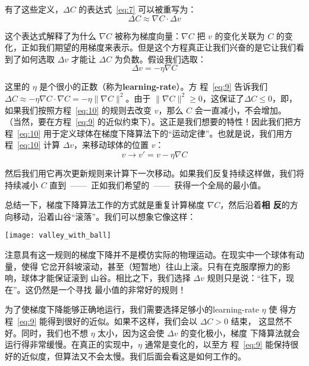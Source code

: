 有了这些定义，$\Delta C$ 的表达式~\eqref{eq:7} 可以被重写为：
\begin{equation}
  \Delta C \approx \nabla C \cdot \Delta v
  \label{eq:9}\tag{9}
\end{equation}

这个表达式解释了为什么 $\nabla C$ 被称为梯度向量：$\nabla C$ 把 $v$ 的变化关联为
$C$ 的变化，正如我们期望的用梯度来表示。但是这个方程真正让我们兴奋的是它让我们看
到了如何选取 $\Delta v$ 才能让 $\Delta C$ 为负数。假设我们选取：
\begin{equation}
  \Delta v = -\eta \nabla C
  \label{eq:10}\tag{10}
\end{equation}

这里的 $\eta$ 是个很小的正数（称为\textbf{\gls{learning-rate}}）。方
程~\eqref{eq:9} 告诉我们 $\Delta C \approx -\eta \nabla C \cdot \nabla C = -\eta
\|\nabla C\|^2$。由于 $\| \nabla C \|^2 \geq 0$，这保证了$\Delta C \leq 0$，即，
如果我们按照方程~\eqref{eq:10} 的规则去改变 $v$，那么 $C$ 会一直减小，不会增加。
（当然，要在方程~\eqref{eq:9} 的近似约束下）。这正是我们想要的特性！因此我们把方
程~\eqref{eq:10} 用于定义球体在梯度下降算法下的“运动定律”。也就是说，我们用方
程~\eqref{eq:10} 计算 $\Delta v$，来移动球体的位置 $v$：
\begin{equation}
  v \rightarrow v' = v -\eta \nabla C
  \label{eq:11}\tag{11}
\end{equation}

然后我们用它再次更新规则来计算下一次移动。如果我们反复持续这样做，我们将持续减小
$C$ 直到~——~正如我们希望的~——~获得一个全局的最小值。

总结一下，梯度下降算法工作的方式就是重复计算梯度 $\nabla C$，然后沿着\textbf{相
  反}的方向移动，沿着山谷“滚落”。我们可以想象它像这样：
\begin{center}
  \texttt{[image: valley\_with\_ball]}
\end{center}

注意具有这一规则的梯度下降并不是模仿实际的物理运动。在现实中一个球体有动量，使得
它岔开斜坡滚动，甚至（短暂地）往山上滚。只有在克服摩擦力的影响，球体才能保证滚到
山谷。相比之下，我们选择 $\Delta v$ 规则只是说：“往下，现在”。这仍然是一个寻找
最小值的非常好的规则！

为了使梯度下降能够正确地运行，我们需要选择足够小的\gls*{learning-rate} $\eta$ 使
得方程~\eqref{eq:9} 能得到很好的近似。如果不这样，我们会以 $\Delta C > 0$ 结束，
这显然不好。同时，我们也不想 $\eta$ 太小，因为这会使 $\Delta v$ 的变化极小，梯度
下降算法就会运行得非常缓慢。在真正的实现中，$\eta$ 通常是变化的，以至方
程~\eqref{eq:9} 能保持很好的近似度，但算法又不会太慢。我们后面会看这是如何工作的。

